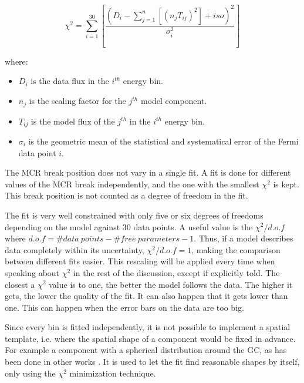 \begin{equation}
\chi^2 = \sum_{i=1}^{30} \left[ \frac{ \left( D_i - \sum_{j=1}^{n} \left[ (n_jT_{ij})^2 \right] + iso \right) ^2}{\sigma_i^2} \right]
\end{equation}

where:
\begin{itemize}
\item $D_i$ is the data flux in the $i^{th}$ energy bin.
\item $n_j$ is the scaling factor for the $j^{th}$ model component.
\item $T_{ij}$ is the model flux of the $j^{th}$ in the $i^{th}$ energy bin.
\item $\sigma_i$ is the geometric mean of the statistical and systematical error of the Fermi data point $i$.
\end{itemize}

The MCR break position does not vary in a single fit. A fit is done for different values of the MCR break independently, and the one with the smallest $\chi^2$ is kept. This break position is not counted as a degree of freedom in the fit.

The fit is very well constrained with only five or six degrees of freedoms depending on the model against 30 data points. A useful value is the $\chi^2 / d.o.f$ where $d.o.f = \#data\ points - \#free\ parameters - 1$. Thus, if a model describes data completely within its uncertainty, $\chi^2 / d.o.f = 1$, making the comparison between different fits easier. This rescaling will be applied every time when speaking about $\chi^2$ in the rest of the discussion, except if explicitly told. 
The closest a $\chi^2$ value is to one, the better the model follows the data. The higher it gets, the lower the quality of the fit. It can also happen that it gets lower than one. This can happen when the error bars on the data are too big.


Since every bin is fitted independently, it is not possible to implement a spatial template, i.e. where the spatial shape of a component would be fixed in advance. For example a component with a spherical distribution around the GC, as has been done in other works . It is used to let the fit find reasonable shapes by itself, only using the $\chi^2$ minimization technique.


